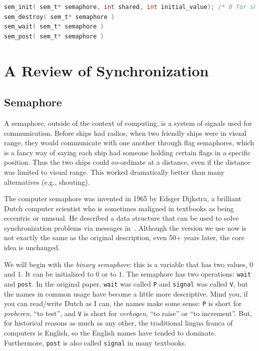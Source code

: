 \documentclass[a4paper]{report}
\begin{document}
\begin{appendices}
\begin{lstlisting}[language=C]
sem_init( sem_t* semaphore, int shared, int initial_value); /* 0 for shared OK */
sem_destroy( sem_t* semaphore )
sem_wait( sem_t* semaphore )
sem_post( sem_t* semaphore )
\end{lstlisting}









\chapter{A Review of Synchronization}

\section*{Semaphore}
A semaphore, outside of the context of computing, is a system of signals used for communication. Before ships had radios, when two friendly ships were in visual range, they would communicate with one another through flag semaphores, which is a fancy way of saying each ship had someone holding certain flags in a specific position. Thus the two ships could co-ordinate at a distance, even if the distance was limited to visual range. This worked dramatically better than many alternatives (e.g., shouting).

The computer semaphore was invented in 1965 by Edsger Dijkstra, a brilliant Dutch computer scientist who is sometimes maligned in textbooks as being eccentric or unusual.  He described a data structure that can be used to solve synchronization problems via messages in~\cite{semaphores}. Although the version we use now is not exactly the same as the original description, even 50+ years later, the core idea is unchanged.

We will begin with the \textit{binary semaphore}: this is a variable that has two values, 0 and 1. It can be initialized to 0 or to 1. The semaphore has two operations: \texttt{wait} and \texttt{post}. In the original paper, \texttt{wait} was called \texttt{P} and \texttt{signal} was called \texttt{V}, but the names in common usage have become a little more descriptive. Mind you, if you can read/write Dutch as I can, the names make some sense: \texttt{P} is short for \textit{proberen}, ``to test'', and \texttt{V} is short for \textit{verhogen}, ``to raise'' or ``to increment''. But, for historical reasons as much as any other, the traditional lingua franca of computers is English, so the English names have tended to dominate. Furthermore, \texttt{post} is also called \texttt{signal} in many textbooks.


\end{appendices}
\end{document}
